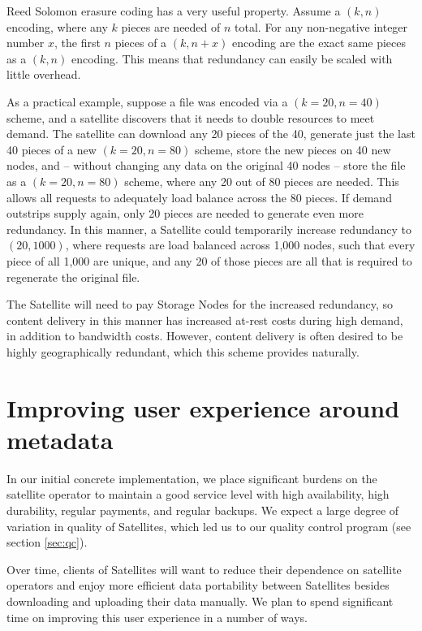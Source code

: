 \documentclass[8pt,fleqn,openany]{book}
\begin{document}
Reed Solomon erasure coding has a very useful property. Assume a $(k, n)$
encoding, where any $k$ pieces are needed of $n$ total. For any non-negative
integer number $x$, the first $n$ pieces of a $(k, n+x)$ encoding are the exact
same pieces as a $(k, n)$ encoding. This means that redundancy can easily be
scaled with little overhead.

As a practical example, suppose a file was encoded via a $(k=20, n=40)$ scheme,
and a satellite discovers that it needs to double resources to meet demand.
The satellite can download any 20 pieces of the 40, generate just the last 40
pieces of a new $(k=20, n=80)$ scheme, store the new pieces on 40 new nodes,
and -- without changing any data on the original 40 nodes -- store the file
as a $(k=20, n=80)$ scheme, where any 20 out of 80 pieces are needed.
This allows all requests to adequately load balance across the 80 pieces.
If demand outstrips supply again, only 20 pieces are needed to generate even
more redundancy. In this manner, a Satellite could temporarily increase
redundancy to $(20, 1000)$, where requests are load balanced across 1,000 nodes,
such that every piece of all 1,000 are unique, and any 20 of those pieces are
all that is required to regenerate the original file.

The Satellite will need to pay Storage Nodes for the increased redundancy, so
content delivery in this manner has increased at-rest costs during high
demand, in addition to bandwidth costs. However, content delivery is often
desired to be highly geographically redundant, which this scheme provides
naturally.

\section{Improving user experience around metadata}\label{sec:distributed-metadata}

In our initial concrete implementation, we place significant burdens on the
satellite operator to maintain a good service level with high availability,
high durability, regular payments, and regular backups. We expect a large
degree of variation in quality of Satellites, which led us to our quality
control program (see section \ref{sec:qc}).

Over time, clients of Satellites will want to reduce their dependence on satellite
operators and enjoy more efficient data portability between Satellites besides
downloading and uploading their data manually. We plan to spend significant time
on improving this user experience in a number of ways.
\end{document}
